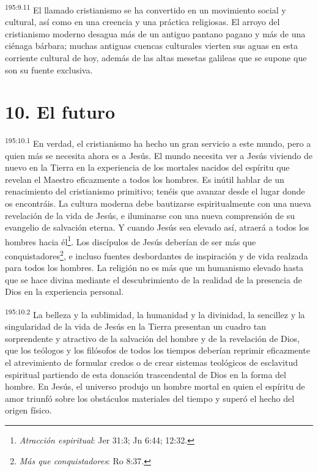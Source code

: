 \par
\textsuperscript{195:9.11} El llamado cristianismo se ha convertido en un movimiento social y cultural, así como en una creencia y una práctica religiosas. El arroyo del cristianismo moderno desagua más de un antiguo pantano pagano y más de una ciénaga bárbara; muchas antiguas cuencas culturales vierten sus aguas en esta corriente cultural de hoy, además de las altas mesetas galileas que se supone que son su fuente exclusiva.

\section*{10. El futuro}
\par
\textsuperscript{195:10.1} En verdad, el cristianismo ha hecho un gran servicio a este mundo, pero a quien más se necesita ahora es a Jesús. El mundo necesita ver a Jesús viviendo de nuevo en la Tierra en la experiencia de los mortales nacidos del espíritu que revelan el Maestro eficazmente a todos los hombres. Es inútil hablar de un renacimiento del cristianismo primitivo; tenéis que avanzar desde el lugar donde os encontráis. La cultura moderna debe bautizarse espiritualmente con una nueva revelación de la vida de Jesús, e iluminarse con una nueva comprensión de su evangelio de salvación eterna. Y cuando Jesús sea elevado así, atraerá a todos los hombres hacia él\footnote{\textit{Atracción espiritual}: Jer 31:3; Jn 6:44; 12:32.}. Los discípulos de Jesús deberían de ser más que conquistadores\footnote{\textit{Más que conquistadores}: Ro 8:37.}, e incluso fuentes desbordantes de inspiración y de vida realzada para todos los hombres. La religión no es más que un humanismo elevado hasta que se hace divina mediante el descubrimiento de la realidad de la presencia de Dios en la experiencia personal.

\par
\textsuperscript{195:10.2} La belleza y la sublimidad, la humanidad y la divinidad, la sencillez y la singularidad de la vida de Jesús en la Tierra presentan un cuadro tan sorprendente y atractivo de la salvación del hombre y de la revelación de Dios, que los teólogos y los filósofos de todos los tiempos deberían reprimir eficazmente el atrevimiento de formular credos o de crear sistemas teológicos de esclavitud espiritual partiendo de esta donación trascendental de Dios en la forma del hombre. En Jesús, el universo produjo un hombre mortal en quien el espíritu de amor triunfó sobre los obstáculos materiales del tiempo y superó el hecho del origen físico.


